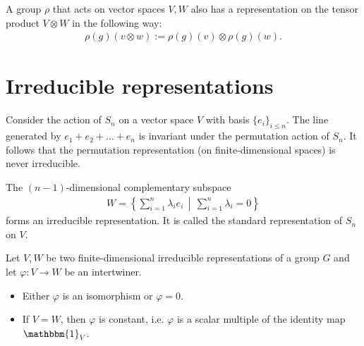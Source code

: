     \begin{example}
        A group $\rho$ that acts on vector spaces $V,W$ also has a representation on the tensor product $V\otimes W$ in the following way:
        \begin{gather}
            \rho(g)(v\otimes w) := \rho(g)(v)\otimes\rho(g)(w).
        \end{gather}
    \end{example}


\section{Irreducible representations}\label{section:irreducibility}


    \begin{example}
        Consider the action of $S_n$ on a vector space $V$ with basis $\{e_i\}_{i\leq n}$. The line generated by $e_1+e_2+\ldots+e_n$ is invariant under the permutation action of $S_n$. It follows that the permutation representation (on finite-dimensional spaces) is never irreducible.

        The $(n-1)$-dimensional complementary subspace
        \begin{gather}
            W = \left\{\sum_{i=1}^n\lambda_ie_i\,\middle\vert\,\sum_{i=1}^n\lambda_i=0\right\}
        \end{gather}
        forms an irreducible representation. It is called the standard representation of $S_n$ on $V$.
    \end{example}

    \begin{theorem}\label{rep:schurs_lemma}
        Let $V,W$ be two finite-dimensional irreducible representations of a group $G$ and let $\varphi:V\rightarrow W$ be an intertwiner.
        \begin{itemize}
            \item Either $\varphi$ is an isomorphism or $\varphi=0$.
            \item If $V=W$, then $\varphi$ is constant, i.e. $\varphi$ is a scalar multiple of the identity map $\mathbbm{1}_V$.
        \end{itemize}
    \end{theorem}

